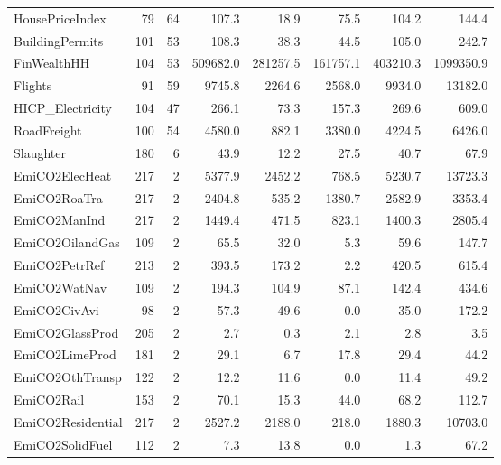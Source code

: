 {\begin{tabular}[t]{lrrrrrrr}
HousePriceIndex & 79 & 64 & \num{107.3} & \num{18.9} & \num{75.5} & \num{104.2} & \num{144.4}\\
BuildingPermits & 101 & 53 & \num{108.3} & \num{38.3} & \num{44.5} & \num{105.0} & \num{242.7}\\
FinWealthHH & 104 & 53 & \num{509682.0} & \num{281257.5} & \num{161757.1} & \num{403210.3} & \num{1099350.9}\\
Flights & 91 & 59 & \num{9745.8} & \num{2264.6} & \num{2568.0} & \num{9934.0} & \num{13182.0}\\
HICP\_Electricity & 104 & 47 & \num{266.1} & \num{73.3} & \num{157.3} & \num{269.6} & \num{609.0}\\
RoadFreight & 100 & 54 & \num{4580.0} & \num{882.1} & \num{3380.0} & \num{4224.5} & \num{6426.0}\\
Slaughter & 180 & 6 & \num{43.9} & \num{12.2} & \num{27.5} & \num{40.7} & \num{67.9}\\
EmiCO2ElecHeat & 217 & 2 & \num{5377.9} & \num{2452.2} & \num{768.5} & \num{5230.7} & \num{13723.3}\\
EmiCO2RoaTra & 217 & 2 & \num{2404.8} & \num{535.2} & \num{1380.7} & \num{2582.9} & \num{3353.4}\\
EmiCO2ManInd & 217 & 2 & \num{1449.4} & \num{471.5} & \num{823.1} & \num{1400.3} & \num{2805.4}\\
EmiCO2OilandGas & 109 & 2 & \num{65.5} & \num{32.0} & \num{5.3} & \num{59.6} & \num{147.7}\\
EmiCO2PetrRef & 213 & 2 & \num{393.5} & \num{173.2} & \num{2.2} & \num{420.5} & \num{615.4}\\
EmiCO2WatNav & 109 & 2 & \num{194.3} & \num{104.9} & \num{87.1} & \num{142.4} & \num{434.6}\\
EmiCO2CivAvi & 98 & 2 & \num{57.3} & \num{49.6} & \num{0.0} & \num{35.0} & \num{172.2}\\
EmiCO2GlassProd & 205 & 2 & \num{2.7} & \num{0.3} & \num{2.1} & \num{2.8} & \num{3.5}\\
EmiCO2LimeProd & 181 & 2 & \num{29.1} & \num{6.7} & \num{17.8} & \num{29.4} & \num{44.2}\\
EmiCO2OthTransp & 122 & 2 & \num{12.2} & \num{11.6} & \num{0.0} & \num{11.4} & \num{49.2}\\
EmiCO2Rail & 153 & 2 & \num{70.1} & \num{15.3} & \num{44.0} & \num{68.2} & \num{112.7}\\
EmiCO2Residential & 217 & 2 & \num{2527.2} & \num{2188.0} & \num{218.0} & \num{1880.3} & \num{10703.0}\\
EmiCO2SolidFuel & 112 & 2 & \num{7.3} & \num{13.8} & \num{0.0} & \num{1.3} & \num{67.2}\\

\end{tabular}}
